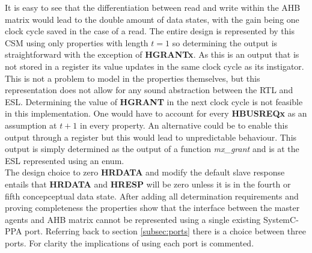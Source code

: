 It is easy to see that the differentiation between read and write within the AHB matrix would lead to the double amount of data states, with the gain being one clock cycle saved in the case of a read. The entire design is represented by this CSM using only properties with length $t=1$ so determining the output is straightforward with the exception of \textbf{HGRANTx}. As this is an output that is not stored in a register its value updates in the same clock cycle as its instigator. This is not a problem to model in the properties themselves, but this representation does not allow for any sound abstraction between the RTL and ESL. Determining the value of \textbf{HGRANT} in the next clock cycle is not feasible in this implementation. One would have to account for every \textbf{HBUSREQx} as an assumption at $t+1$ in every property. An alternative could be to enable this output through a register but this would lead to unpredictable behaviour. This output is simply determined as the output of a function \textit{mx\_grant} and is at the ESL represented using an enum. \\
\newline
The design choice to zero \textbf{HRDATA} and modify the default slave response entails that \textbf{HRDATA} and \textbf{HRESP} will be zero unless it is in the fourth or fifth concepceptual data state. After adding all determination requirements and proving completeness the properties show that the interface between the master agents and AHB matrix cannot be represented using a single existing SystemC-PPA port. Referring back to section \ref{subsec:ports} there is a choice between three ports. For clarity the implications of using each port is commented.
